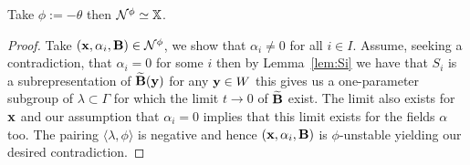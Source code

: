 \documentclass{amsart}
\theoremstyle{definition}
\begin{document}



\begin{corollary}
Take $\phi:= -\theta$ then $\mathcal{N}^\phi \simeq \mathbb{X}$.
\end{corollary}

\begin{proof}
Take $(\mathbf{x}, \alpha_i, \mathbf{B}) \in \mathcal{N}^\phi$, we show that $\alpha_i \neq 0$ for all $i \in I$.
Assume, seeking a contradiction, that $\alpha_i =0$ for some $i$ then by Lemma~\ref{lem:Si} we have that $S_i$ is a subrepresentation of $\widetilde{\mathbf{B}}(\mathbf{y})$ for any $\mathbf{y} \in W$ this gives us a one-parameter subgroup of $\lambda \subset \Gamma$ for which the limit $t \rightarrow 0$ of $\widetilde{\mathbf{B}}$ exist.
The limit also exists for $\mathbf{x}$ and our assumption that $\alpha_i=0$ implies that this limit exists for the fields $\alpha$ too.
The pairing $\langle \lambda, \phi \rangle$ is negative and hence $(\mathbf{x}, \alpha_i, \mathbf{B})$ is $\phi$-unstable yielding our desired contradiction.

\end{proof}
\end{document}
